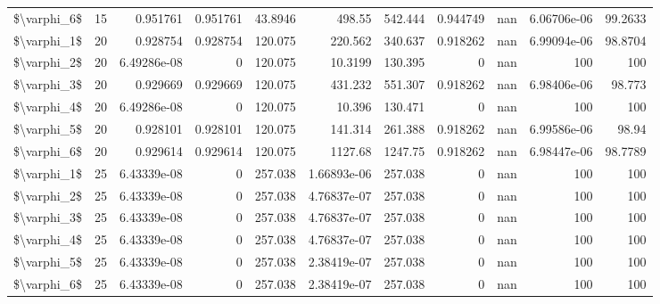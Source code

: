 \begin{tabular}{lrrrrrrrrrr}
 \$\textbackslash{}varphi\_6\$ &  15 & 0.951761    & 0.951761 &     43.8946 &  498.55        &     542.444  &     0.944749 &         nan &   6.06706e-06 &  99.2633      \\
 \$\textbackslash{}varphi\_1\$ &  20 & 0.928754    & 0.928754 &    120.075  &  220.562       &     340.637  &     0.918262 &         nan &   6.99094e-06 &  98.8704      \\
 \$\textbackslash{}varphi\_2\$ &  20 & 6.49286e-08 & 0        &    120.075  &   10.3199      &     130.395  &     0        &         nan & 100           & 100           \\
 \$\textbackslash{}varphi\_3\$ &  20 & 0.929669    & 0.929669 &    120.075  &  431.232       &     551.307  &     0.918262 &         nan &   6.98406e-06 &  98.773       \\
 \$\textbackslash{}varphi\_4\$ &  20 & 6.49286e-08 & 0        &    120.075  &   10.396       &     130.471  &     0        &         nan & 100           & 100           \\
 \$\textbackslash{}varphi\_5\$ &  20 & 0.928101    & 0.928101 &    120.075  &  141.314       &     261.388  &     0.918262 &         nan &   6.99586e-06 &  98.94        \\
 \$\textbackslash{}varphi\_6\$ &  20 & 0.929614    & 0.929614 &    120.075  & 1127.68        &    1247.75   &     0.918262 &         nan &   6.98447e-06 &  98.7789      \\
 \$\textbackslash{}varphi\_1\$ &  25 & 6.43339e-08 & 0        &    257.038  &    1.66893e-06 &     257.038  &     0        &         nan & 100           & 100           \\
 \$\textbackslash{}varphi\_2\$ &  25 & 6.43339e-08 & 0        &    257.038  &    4.76837e-07 &     257.038  &     0        &         nan & 100           & 100           \\
 \$\textbackslash{}varphi\_3\$ &  25 & 6.43339e-08 & 0        &    257.038  &    4.76837e-07 &     257.038  &     0        &         nan & 100           & 100           \\
 \$\textbackslash{}varphi\_4\$ &  25 & 6.43339e-08 & 0        &    257.038  &    4.76837e-07 &     257.038  &     0        &         nan & 100           & 100           \\
 \$\textbackslash{}varphi\_5\$ &  25 & 6.43339e-08 & 0        &    257.038  &    2.38419e-07 &     257.038  &     0        &         nan & 100           & 100           \\
 \$\textbackslash{}varphi\_6\$ &  25 & 6.43339e-08 & 0        &    257.038  &    2.38419e-07 &     257.038  &     0        &         nan & 100           & 100           \\

\end{tabular}
